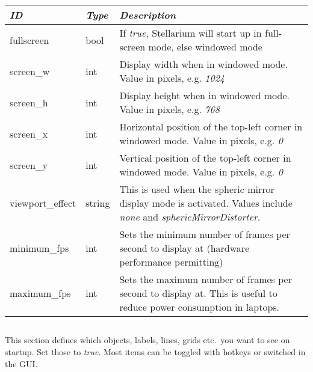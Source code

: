 \begin{longtabu} to \textwidth {l|l|X}\toprule
\emph{ID}  & \emph{Type} & \emph{Description}\\\midrule
fullscreen       & bool   & If \emph{true}, Stellarium will start up in full-screen mode, else windowed mode\\\midrule
screen\_w        & int    & Display width when in windowed mode. Value in pixels, e.g. \emph{1024}\\\midrule
screen\_h        & int    & Display height when in windowed mode. Value in pixels, e.g. \emph{768}\\\midrule
screen\_x        & int    & Horizontal position of the top-left corner in windowed mode. Value in pixels, e.g. \emph{0}\\\midrule
screen\_y        & int    & Vertical   position of the top-left corner in windowed mode. Value in pixels, e.g. \emph{0}\\\midrule
viewport\_effect & string & This is used when the spheric mirror display mode is activated. Values include \emph{none} and \emph{sphericMirrorDistorter}.\\\midrule
minimum\_fps     & int    & Sets the minimum number of frames per second to display at (hardware performance permitting)\\\midrule
maximum\_fps     & int    & Sets the maximum number of frames per second to display at. This is useful to reduce power consumption in laptops.\\\bottomrule
\end{longtabu}

\subsection{}\label{sec:config.ini:viewing}

This section defines which objects, labels, lines, grids etc.\ you
want to see on startup. Set those to \emph{true}. Most items can be
toggled with hotkeys or switched in the GUI.

